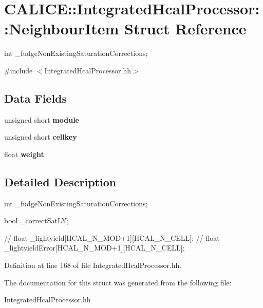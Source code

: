 \section{C\-A\-L\-I\-C\-E\-:\-:Integrated\-Hcal\-Processor\-:\-:Neighbour\-Item Struct Reference}
\label{structCALICE_1_1IntegratedHcalProcessor_1_1NeighbourItem}


int \-\_\-fudge\-Non\-Existing\-Saturation\-Corrections;  




{\ttfamily \#include $<$Integrated\-Hcal\-Processor.\-hh$>$}

\subsection*{Data Fields}
\begin{DoxyCompactItemize}
\item 
unsigned short {\bfseries module}\label{structCALICE_1_1IntegratedHcalProcessor_1_1NeighbourItem_a222785cbd28eaf736340eef25e436e20}

\item 
unsigned short {\bfseries cellkey}\label{structCALICE_1_1IntegratedHcalProcessor_1_1NeighbourItem_a145ab8e4188b4e065424e61b1281dbdb}

\item 
float {\bfseries weight}\label{structCALICE_1_1IntegratedHcalProcessor_1_1NeighbourItem_a9c688d0bbc8c74d9a8403c0d8f12f0f6}

\end{DoxyCompactItemize}


\subsection{Detailed Description}
int \-\_\-fudge\-Non\-Existing\-Saturation\-Corrections; 

bool \-\_\-correct\-Sat\-L\-Y;

// float \-\_\-lightyield[H\-C\-A\-L\-\_\-\-N\-\_\-\-M\-O\-D+1][H\-C\-A\-L\-\_\-\-N\-\_\-\-C\-E\-L\-L]; // float \-\_\-lightyield\-Error[H\-C\-A\-L\-\_\-\-N\-\_\-\-M\-O\-D+1][H\-C\-A\-L\-\_\-\-N\-\_\-\-C\-E\-L\-L]; 

Definition at line 168 of file Integrated\-Hcal\-Processor.\-hh.



The documentation for this struct was generated from the following file\-:\begin{DoxyCompactItemize}
\item 
Integrated\-Hcal\-Processor.\-hh\end{DoxyCompactItemize}
